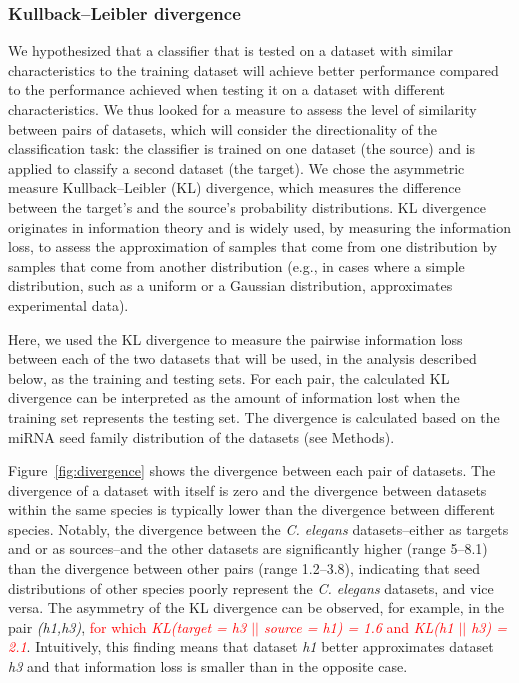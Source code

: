 \documentclass{bmcart}
\begin{document}
\subsubsection*{Kullback–Leibler divergence}
We hypothesized that a classifier that is tested on a dataset with similar characteristics to the training dataset will achieve better performance compared to the performance achieved when testing it on a dataset with different characteristics.
We thus looked for a measure to assess the level of similarity between pairs of datasets, which will consider the directionality of the classification task: the classifier is trained on one dataset (the source) and is applied to classify a second dataset (the target).
We chose the asymmetric measure Kullback–Leibler (KL) divergence, which measures the difference between the target's and the source's probability distributions.
KL divergence originates in information theory and is widely used, by measuring the information loss, to assess the approximation of samples that come from one distribution by samples that come from another distribution (e.g., in cases where a simple distribution, such as a uniform or a Gaussian distribution, approximates experimental data).

Here, we used the KL divergence to measure the pairwise information loss between each of the two datasets that will be used, in the analysis described below, as the training and testing sets. For each pair, the calculated KL divergence can be interpreted as the amount of information lost when the training set represents the testing set. The divergence is calculated based on the miRNA seed family distribution of the datasets (see Methods).

Figure~\ref{fig:divergence} shows the divergence between each pair of datasets. The divergence of a dataset with itself is zero and the divergence between datasets within the same species is typically lower than the divergence between different species. Notably, the divergence between the \textit{C. elegans} datasets--either as targets and or as sources--and the other datasets are significantly higher (range 5--8.1) than the divergence between other pairs (range 1.2--3.8), indicating that seed distributions of other species poorly represent the \textit{C. elegans} datasets, and vice versa. The asymmetry of the KL divergence can be observed, for example, in the pair \textit{(h1,h3)}, \textcolor{red}{for which \textit{KL(target = h3 $||$ source = h1) = 1.6} and \textit{KL(h1 $||$ h3) = 2.1}}. Intuitively, this finding means that dataset \textit{h1} better approximates dataset \textit{h3} and that information loss is smaller than in the opposite case.
\end{document}
